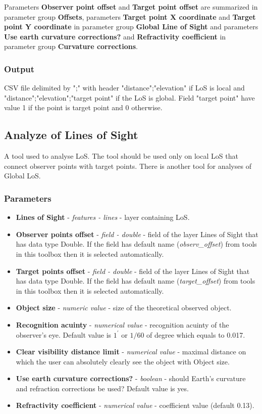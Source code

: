 \documentclass[]{article}
\begin{document}
Parameters \textbf{Observer point offset} and \textbf{Target point offset} are summarized in parameter group \textbf{Offsets}, parameters \textbf{Target point X coordinate} and \textbf{Target point Y coordinate} in parameter group \textbf{Global Line of Sight} and parameters \textbf{Use earth curvature corrections?} and \textbf{Refractivity coefficient} in parameter group \textbf{Curvature corrections}.

\subsubsection{Output}

CSV file delimited by ";" with header "distance";"elevation" if LoS is local and "distance";"elevation";"target point"  if the LoS is global. Field "target point" have value 1 if the point is target point and 0 otherwise.

\subsection{Analyze of Lines of Sight}

A tool used to analyse LoS. The tool should be used only on local LoS that connect observer points with target points. There is another tool for analyses of Global LoS.

\subsubsection{Parameters}
\begin{itemize}
	\item \textbf{Lines of Sight} - \textit{features - lines} - layer containing LoS.
	\item \textbf{Observer points offset} - \textit{field - double} - field of the layer Lines of Sight that has data type Double. If the field has default name (\textit{observ\_offset}) from tools in this toolbox then it is selected automatically.
	\item \textbf{Target points offset} - \textit{field - double} - field of the layer Lines of Sight that has data type Double. If the field has default name (\textit{target\_offset}) from tools in this toolbox then it is selected automatically.
	\item \textbf{Object size} - \textit{numeric value} - size of the theoretical observed object.
	\item \textbf{Recognition acuinty} - \textit{numerical value} - recognition acuinty of the observer's eye. Default value is $1^\prime$ or $1/60$ of degree which equals to 0.017. 
	\item \textbf{Clear visibility distance limit} - \textit{numerical value} - maximal distance on which the user can absolutely clearly see the object with Object size.
	\item \textbf{Use earth curvature corrections?} - \textit{boolean} - should Earth's curvature and refraction corrections be used? Default value is yes.
	\item \textbf{Refractivity coefficient} - \textit{numerical value}  - coefficient value (default 0.13).
\end{itemize}
\end{document}
